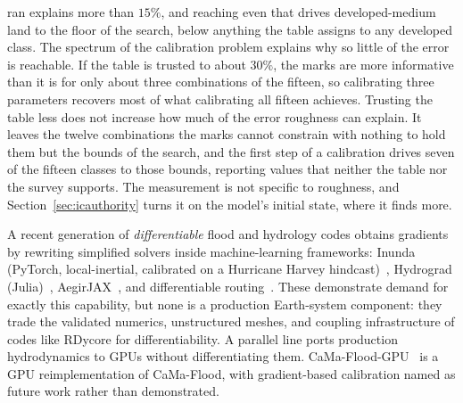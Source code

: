 \documentclass[11pt]{article}
\begin{document}
ran explains more than $15\%$, and reaching even that drives
developed-medium land to the floor of the search, below anything the
table assigns to any developed class. The spectrum of the calibration
problem explains why so little of the error is reachable. If the table
is trusted to about $30\%$, the marks are more informative than it is
for only about three combinations of the fifteen, so calibrating three
parameters recovers most of what calibrating all fifteen achieves.
Trusting the table less does not increase how much of the error
roughness can explain. It leaves the twelve combinations the marks
cannot constrain with nothing to hold them but the bounds of the
search, and the first step of a calibration drives seven of the
fifteen classes to those bounds, reporting values that neither the
table nor the survey supports.
The measurement is not specific to roughness, and
Section~\ref{sec:icauthority} turns it on the model's initial state,
where it finds more.

A recent generation of \emph{differentiable} flood and hydrology codes
obtains gradients by rewriting simplified solvers inside
machine-learning frameworks: Inunda (PyTorch, local-inertial,
calibrated on a Hurricane Harvey hindcast)~\cite{li2026inunda},
Hydrograd (Julia)~\cite{liu2025uswe}, AegirJAX~\cite{cardoso2026aegir},
and differentiable routing~\cite{bindas2024routing}. These demonstrate
demand for exactly this capability, but none is a production
Earth-system component: they trade the validated numerics,
unstructured meshes, and coupling infrastructure of codes like RDycore
for differentiability. A parallel line ports production hydrodynamics
to GPUs without differentiating them. CaMa-Flood-GPU~\cite{kang2026cama}
is a GPU reimplementation of CaMa-Flood, with gradient-based
calibration named as future work rather than demonstrated.
\end{document}

